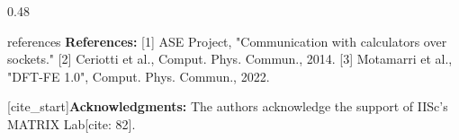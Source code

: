 \documentclass[serif,mathserif,final]{beamer}
\begin{document}
\begin{frame}[t]
\begin{columns}[t]
\begin{column}{0.48\paperwidth}
            \begin{beamercolorbox}[wd=\linewidth, leftskip=1em]{references}
                \small \textbf{References:}
                [1] ASE Project, "Communication with calculators over sockets."
                [2] Ceriotti et al., Comput. Phys. Commun., 2014.
                [3] Motamarri et al., "DFT-FE 1.0", Comput. Phys. Commun., 2022.
                
                \vspace{0.5em}
                [cite_start]\textbf{Acknowledgments:} The authors acknowledge the support of IISc's MATRIX Lab[cite: 82].
            \end{beamercolorbox}

        \end{column}
    \end{columns}
\end{frame}
\end{document}
